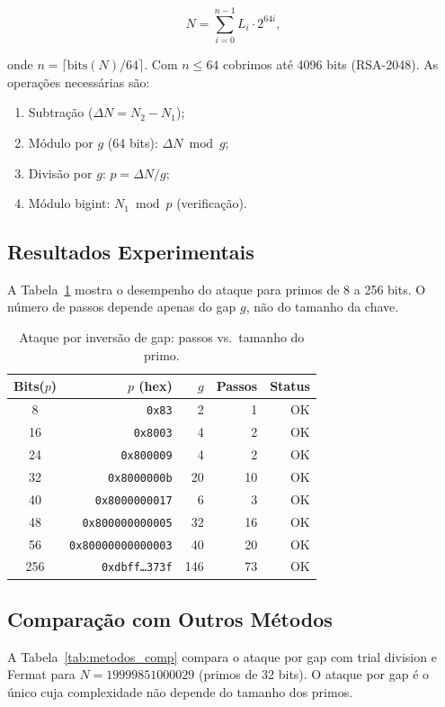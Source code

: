 \documentclass[12pt,a4paper]{article}
\theoremstyle{plain}
\begin{document}
\[
N = \sum_{i=0}^{n-1} L_i \cdot 2^{64i},
\]

onde $n = \lceil \text{bits}(N) / 64 \rceil$.  Com $n \leq 64$
cobrimos até 4096 bits (RSA-2048).  As operações necessárias são:
\begin{enumerate}
  \item Subtração ($\Delta N = N_2 - N_1$);
  \item Módulo por $g$ (64 bits): $\Delta N \bmod g$;
  \item Divisão por $g$: $p = \Delta N / g$;
  \item Módulo bigint: $N_1 \bmod p$ (verificação).
\end{enumerate}

\subsection{Resultados Experimentais}

A Tabela~\ref{tab:gap_inversion} mostra o desempenho do ataque
para primos de 8 a 256 bits.  O número de passos depende apenas
do gap $g$, não do tamanho da chave.

\begin{table}[htbp]
\centering
\caption{Ataque por inversão de gap: passos vs.\ tamanho do primo.}
\label{tab:gap_inversion}
\begin{tabular}{crrrr}
\hline
Bits($p$) & $p$ (hex) & $g$ & Passos & Status \\
\hline
8  & \texttt{0x83} & 2  & 1   & OK \\
16 & \texttt{0x8003} & 4  & 2   & OK \\
24 & \texttt{0x800009} & 4  & 2   & OK \\
32 & \texttt{0x8000000b} & 20 & 10  & OK \\
40 & \texttt{0x8000000017} & 6  & 3   & OK \\
48 & \texttt{0x800000000005} & 32 & 16  & OK \\
56 & \texttt{0x80000000000003} & 40 & 20  & OK \\
256 & \texttt{0xdbff\ldots 373f} & 146 & 73 & OK \\
\hline
\end{tabular}
\end{table}

\subsection{Comparação com Outros Métodos}

A Tabela~\ref{tab:metodos_comp} compara o ataque por gap com
trial division e Fermat para $N = 19999851000029$ (primos de
32 bits).  O ataque por gap é o único cuja complexidade não
depende do tamanho dos primos.
\end{document}
